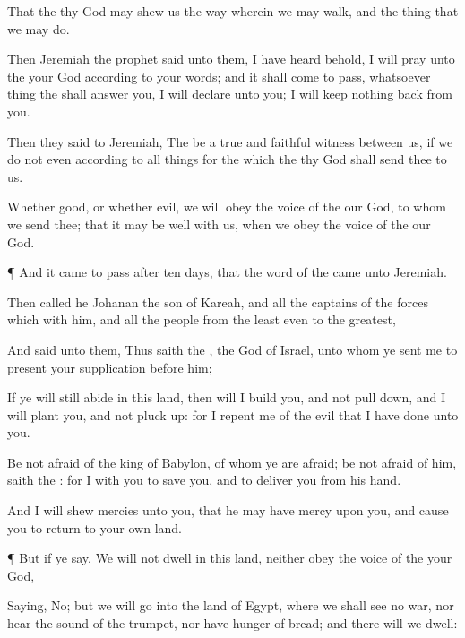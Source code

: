{That the
{} thy
God may
shew us the
way wherein we may
walk, and the
thing that we may
do.

Then
Jeremiah the
prophet
said unto them, I have
heard
{} behold, I will
pray unto the
{} your
God according to your
words; and it shall come to pass,
{} whatsoever
thing the
{} shall
answer you, I will
declare
{} unto you; I will
keep
nothing
back from you.

Then they
said to
Jeremiah, The
{} be a
true and
faithful
witness between us, if we
do not even according to all
things for the which the
{} thy
God shall
send thee to us.

Whether
{}
good, or whether
{}
evil, we will
obey the
voice of the
{} our
God, to whom
we
send thee; that it may be
well with us, when we
obey the
voice of the
{} our
God.


\par }{\PP {}¶ And it came to pass
after
ten
days, that the
word of the
{} came unto
Jeremiah.

Then
called he
Johanan the
son of
Kareah, and all the
captains of the
forces which
{} with him, and all the
people from the
least even to the
greatest,

And
said unto them, Thus
saith the
{}, the
God of
Israel, unto whom ye
sent me to
present your
supplication
before him;

If ye will
still
abide in this
land, then will I
build you, and not pull
{}
down, and I will
plant you, and not pluck
{}
up: for I
repent me of the
evil that I have
done unto you.

Be not
afraid
of the
king of
Babylon, of
whom ye are
afraid; be not
afraid of him,
saith the
{}: for I
{} with you to
save you, and to
deliver you from his
hand.

And I will
shew
mercies unto you, that he may have
mercy upon you, and cause you to
return to your own
land.


\par }{\PP {}¶ But if ye
say, We will not
dwell in this
land, neither
obey the
voice of the
{} your
God,

Saying, No; but we will
go into the
land of
Egypt, where we shall
see no
war, nor
hear the
sound of the
trumpet, nor have
hunger of
bread; and there will we
dwell:

}
